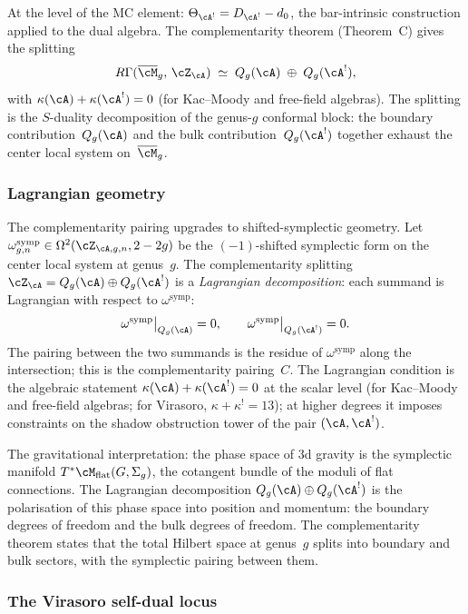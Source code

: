At the level of the MC element:
$\Theta_{\cA^!}=D_{\cA^!}-d_0$, the bar-intrinsic construction
applied to the dual algebra. The complementarity theorem
(Theorem~C) gives the splitting
\[
R\Gamma(\overline{\cM}_g,\,\cZ_\cA)
\;\simeq\;
Q_g(\cA)\;\oplus\;Q_g(\cA^!),
\]
with $\kappa(\cA)+\kappa(\cA^!)=0$ (for Kac--Moody and
free-field algebras). The splitting is the
$S$-duality decomposition of the genus-$g$ conformal block:
the boundary contribution~$Q_g(\cA)$ and the bulk
contribution~$Q_g(\cA^!)$ together exhaust the center local
system on~$\overline{\cM}_g$.

\subsubsection*{Lagrangian geometry}

The complementarity pairing upgrades to shifted-symplectic
geometry. Let
$\omega^{\mathrm{symp}}_{g,n}\in\Omega^2(\cZ_{\cA,g,n},2-2g)$
be the $(-1)$-shifted symplectic form on the center local system
at genus~$g$. The complementarity splitting
$\cZ_\cA=Q_g(\cA)\oplus Q_g(\cA^!)$ is a \emph{Lagrangian
decomposition}: each summand is Lagrangian with respect to
$\omega^{\mathrm{symp}}$:
\[
\omega^{\mathrm{symp}}\big|_{Q_g(\cA)}=0,
\qquad
\omega^{\mathrm{symp}}\big|_{Q_g(\cA^!)}=0.
\]
The pairing between the two summands is the residue of
$\omega^{\mathrm{symp}}$ along the intersection; this is
the complementarity pairing~$C$. The Lagrangian condition
is the algebraic statement $\kappa(\cA)+\kappa(\cA^!)=0$
at the scalar level (for Kac--Moody and free-field algebras;
for Virasoro, $\kappa+\kappa^!=13$); at higher degrees it
imposes constraints on the shadow obstruction tower of the pair
$(\cA,\cA^!)$.

The gravitational interpretation: the phase space of
3d gravity is the symplectic manifold
$T^*\cM_{\mathrm{flat}}(G,\Sigma_g)$, the cotangent bundle
of the moduli of flat connections. The Lagrangian decomposition
$Q_g(\cA)\oplus Q_g(\cA^!)$ is the polarisation of this phase
space into position and momentum: the boundary degrees of freedom
and the bulk degrees of freedom. The complementarity theorem
states that the total Hilbert space at genus~$g$ splits into
boundary and bulk sectors, with the symplectic pairing between
them.

\subsubsection*{The Virasoro self-dual locus}

